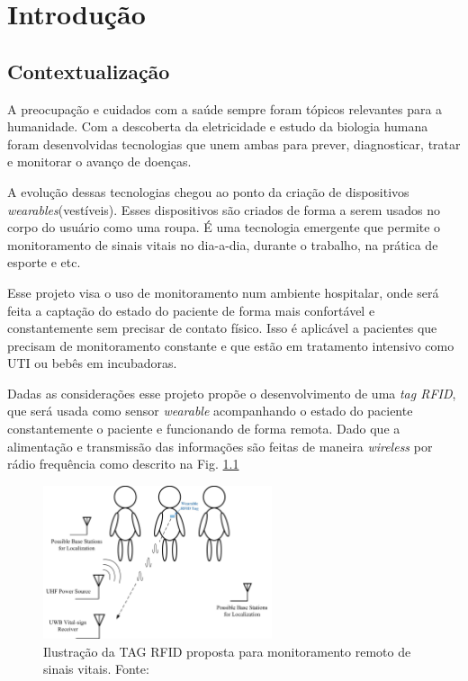 \chapter[Introdução]{Introdução}


\section{Contextualização}

A preocupação e cuidados com a saúde sempre foram tópicos relevantes para a humanidade. Com a descoberta da eletricidade e estudo da biologia humana foram desenvolvidas tecnologias que unem ambas para prever, diagnosticar, tratar e monitorar o avanço de doenças. 

A evolução dessas tecnologias chegou ao ponto da criação de dispositivos \textit{wearables}(vestíveis). Esses dispositivos são criados de forma a serem usados no corpo do usuário como uma roupa. É uma tecnologia emergente que permite o monitoramento de sinais vitais no dia-a-dia, durante o trabalho, na prática de esporte e etc.\cite{site_wearebles}

Esse projeto visa o uso de monitoramento num ambiente hospitalar, onde será feita a captação do estado do paciente de forma mais confortável e constantemente sem precisar de contato físico. Isso é aplicável a pacientes que precisam de monitoramento constante e que estão em tratamento intensivo como UTI ou bebês em incubadoras.\cite{artigo_principal}

Dadas as considerações esse projeto propõe o desenvolvimento de uma \textit{tag RFID}, que será usada como sensor \textit{wearable} acompanhando o estado do paciente constantemente o paciente e funcionando de forma remota. Dado que a alimentação e transmissão das informações são feitas de maneira \textit{wireless} por rádio frequência como descrito na Fig. 
\ref{fig01}


\begin{figure}[h]
	\centering
	\includegraphics[width=0.6\textwidth]{figuras/rfid_tag.png}
	\caption{Ilustração da TAG RFID proposta para monitoramento remoto de sinais vitais. Fonte:\cite{artigo_principal} }
	\label{fig01}
\end{figure}

